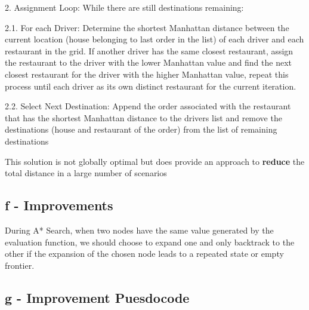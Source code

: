 \documentclass{article}
\begin{document}
2. Assignment Loop: While there are still destinations remaining:

2.1. For each Driver: Determine the shortest Manhattan distance between the current location (house belonging to last order in the list) of each driver and each restaurant in the grid. If another driver has the same closest restaurant, assign the restaurant to the driver with the lower Manhattan value and find the next closest restaurant for the driver with the higher Manhattan value, repeat this process until each driver as its own distinct restaurant for the current iteration. 

2.2. Select Next Destination: Append the order associated with the restaurant that has the shortest Manhattan distance to the drivers list and remove the destinations (house and restaurant of the order) from the list of remaining destinations

This solution is not globally optimal but does provide an approach to \textbf{reduce} the total distance in a large number of scenarios

\subsection{f - Improvements}

During A* Search, when two nodes have the same value generated by the evaluation function, we should choose to expand one and only backtrack to the other if the expansion of the chosen node leads to a repeated state or empty frontier. 

\subsection{g - Improvement Puesdocode}
\end{document}

